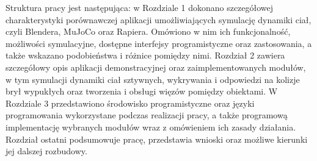 Struktura pracy jest następująca: w Rozdziale 1 dokonano szczegółowej charakterystyki
porównawczej aplikacji umożliwiających symulację dynamiki ciał, czyli Blendera, MuJoCo oraz Rapiera.
Omówiono w nim ich funkcjonalność, możliwości symulacyjne, dostępne interfejsy programistyczne oraz zastosowania,
a także wskazano podobieństwa i różnice pomiędzy nimi.
Rozdział 2 zawiera szczegółowy opis aplikacji
demonstracyjnej oraz zaimplementowanych modułów, w tym symulacji dynamiki ciał sztywnych,
wykrywania i odpowiedzi na kolizje brył wypukłych oraz tworzenia i obsługi więzów
pomiędzy obiektami.
W Rozdziale 3 przedstawiono środowisko programistyczne oraz języki
programowania wykorzystane podczas realizacji pracy, a także programową implementację
wybranych modułów wraz z omówieniem ich zasady działania. Rozdział ostatni podsumowuje
pracę, przedstawia wnioski oraz możliwe kierunki jej dalszej rozbudowy.


